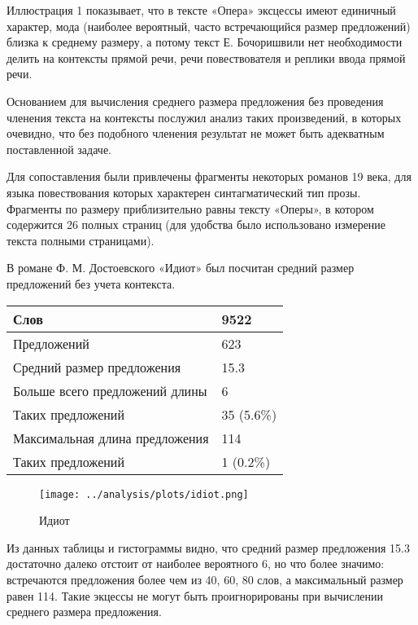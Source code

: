 \documentclass{kursa4}
\begin{document}
{{        {Иллюстрация 1 показывает, что в тексте «Опера»
        эксцессы имеют единичный характер, мода (наиболее вероятный, часто
        встречающийся размер предложений) близка к среднему размеру, а потому
        текст Е. Бочоришвили нет необходимости делить на контексты прямой речи,
        речи повествователя и реплики ввода прямой речи. }

        {Основанием для вычисления среднего размера
        предложения без проведения членения текста на контексты послужил
        анализ таких произведений, в которых очевидно, что без подобного
        членения результат не может быть адекватным поставленной задаче. }

        Для сопоставления были привлечены фрагменты
        некоторых романов 19 века, для языка повествования которых характерен
        синтагматический тип прозы. Фрагменты по размеру приблизительно равны
        тексту «Оперы», в котором содержится 26 полных страниц (для удобства
        было использовано измерение текста полными страницами).

        В романе Ф. М. Достоевского «Идиот» был посчитан
        средний размер предложений без учета контекста. 

        \begin{center}
        \tablehead{}
        \begin{tabular}{|m{5.7730002cm}|m{1.6559999cm}|}
          \hline
          Слов &
          9522\\\hline
          Предложений &
          623\\\hline
          Средний размер предложения &
          15.3\\\hline
          Больше всего предложений длины &
          6\\\hline
          Таких предложений &
          35 (5.6\%)\\\hline
          Максимальная длина предложения &
          114\\\hline
          Таких предложений &
          1 (0.2\%)\\\hline
        \end{tabular}
        \end{center}

        \begin{figure}[htbp]
          \centering
          \texttt{[image: ../analysis/plots/idiot.png]}
          \caption{Идиот}
        \end{figure}
        

        Из данных таблицы и гистограммы видно, что средний размер предложения 15.3 достаточно далеко отстоит от наиболее вероятного 6, но что более значимо: встречаются предложения более чем из 40, 60, 80 слов, а максимальный размер равен 114. Такие экцессы не
        могут быть проигнорированы при вычислении среднего размера предложения.

}}
\end{document}
